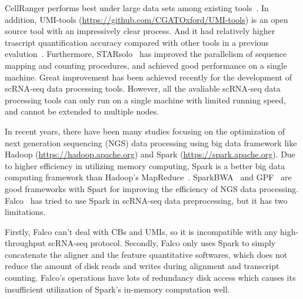 \documentclass[conference]{IEEEtran}
\begin{document}

CellRanger performs best under large data sets among existing tools~\cite{Gao2020Comparison}.
In addition, UMI-tools (\url{https://github.com/CGATOxford/UMI-tools}) is an open source tool with an impressively clear process. And it had relatively higher trascript quantification accuracy compared with other tools in a previous evalution~\cite{Gao2020Comparison}. 
Furthermore, STARsolo~\cite{Blibaum2019STARsolo} has improved the parallelism of sequence mapping and counting procedures, and achieved good performance on a single machine.
Great improvement has been achieved recently for the development of scRNA-seq data processing tools. However, all the avaliable scRNA-seq data processing tools can only run on a single machine with limited running speed, and cannot be extended to multiple nodes.

In recent years, there have been many studies focusing on the optimization of next generation sequencing (NGS) data processing using big data framework like Hadoop (\url{https://hadoop.apache.org}) and Spark (\url{https://spark.apache.org}). 
Due to higher efficiency in utilizing memory computing, Spark is a better big data computing framework than Hadoop's MapReduce~\cite{Dean2008MapReduce, Zaharia2012Resilient}. 
SparkBWA~\cite{Abun2016SparkBWA} and GPF~\cite{Li2018Highperformance} are good frameworks with Spart for improving the efficiency of NGS data processing. 
Falco~\cite{Yang2017Falco} has tried to use Spark in scRNA-seq data preprocessing, but it has two limitations. 

Firstly, Falco can't deal with CBs and UMIs, so it is incompatible with any high-throughput scRNA-seq protocol.
Secondly, Falco only uses Spark to simply concatenate the aligner and the feature quantitative softwares, which does not reduce the amount of disk reads and writes during alignment and transcript counting.
Falco’s operations have lots of redundancy disk access which causes its insufficient utilization of Spark’s in-memory computation well. 
\end{document}
